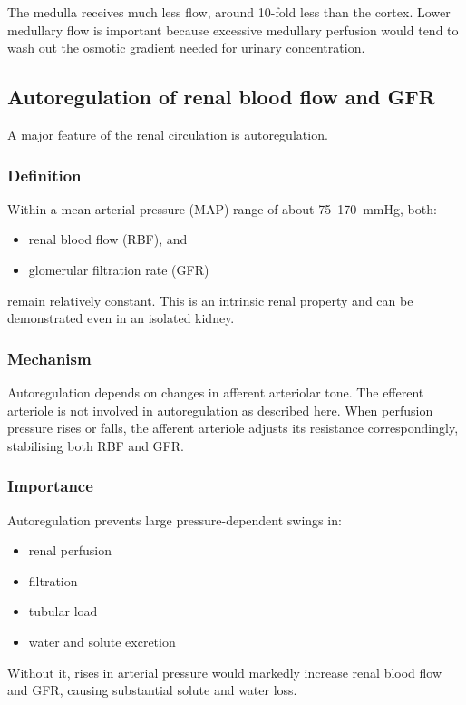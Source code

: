\documentclass[11pt,a4paper]{article}
\begin{document}
The medulla receives much less flow, around 10-fold less than the cortex. Lower medullary flow is important because excessive medullary perfusion would tend to wash out the osmotic gradient needed for urinary concentration.

\subsection{Autoregulation of renal blood flow and GFR}

A major feature of the renal circulation is autoregulation.

\subsubsection{Definition}

Within a mean arterial pressure (MAP) range of about 75--170~mmHg, both:
\begin{itemize}
    \item renal blood flow (RBF), and
    \item glomerular filtration rate (GFR)
\end{itemize}
remain relatively constant. This is an intrinsic renal property and can be demonstrated even in an isolated kidney.

\subsubsection{Mechanism}

Autoregulation depends on changes in afferent arteriolar tone. The efferent arteriole is not involved in autoregulation as described here. When perfusion pressure rises or falls, the afferent arteriole adjusts its resistance correspondingly, stabilising both RBF and GFR.

\subsubsection{Importance}

Autoregulation prevents large pressure-dependent swings in:
\begin{itemize}
    \item renal perfusion
    \item filtration
    \item tubular load
    \item water and solute excretion
\end{itemize}

Without it, rises in arterial pressure would markedly increase renal blood flow and GFR, causing substantial solute and water loss.
\end{document}
